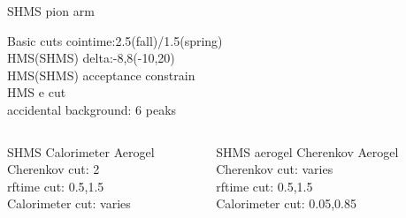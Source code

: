 \documentclass[aspectratio=169,xcolor=dvipsnames]{beamer}
\begin{document}
\begin{frame}{SHMS pion arm}
  \begin{block}{Basic cuts}
    cointime:2.5(fall)/1.5(spring) \\
    HMS(SHMS) delta:-8,8(-10,20) \\
    HMS(SHMS) acceptance constrain \\
    HMS e cut \\
    accidental background: 6 peaks \\
  \end{block}
  \begin{columns}
    \begin{column}[T]{0.5\textwidth}
     \begin{block}{SHMS Calorimeter}
       Aerogel Cherenkov cut: 2 \\
       rftime cut: 0.5,1.5 \\ 
       Calorimeter cut: varies 
     \end{block}
   \end{column}
   \begin{column}[T]{0.5\textwidth}
     \begin{block}{SHMS aerogel Cherenkov}
       Aerogel Cherenkov cut: varies \\
       rftime cut: 0.5,1.5 \\ 
       Calorimeter cut: 0.05,0.85
       \end{block}
     \end{column}
   \end{columns}

\end{frame}
\end{document}
